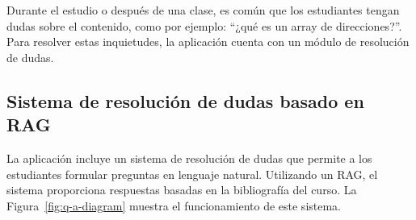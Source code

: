 Durante el estudio o después de una clase, es común que los estudiantes tengan dudas sobre el contenido, como por ejemplo: ``¿qué es un array de direcciones?''. Para resolver estas inquietudes, la aplicación cuenta con un módulo de resolución de dudas.

\subsection{Sistema de resolución de dudas basado en RAG}

La aplicación incluye un sistema de resolución de dudas que permite a los estudiantes formular preguntas en lenguaje natural. Utilizando un RAG, el sistema proporciona respuestas basadas en la bibliografía del curso. La Figura~\ref{fig:q-a-diagram} muestra el funcionamiento de este sistema.

